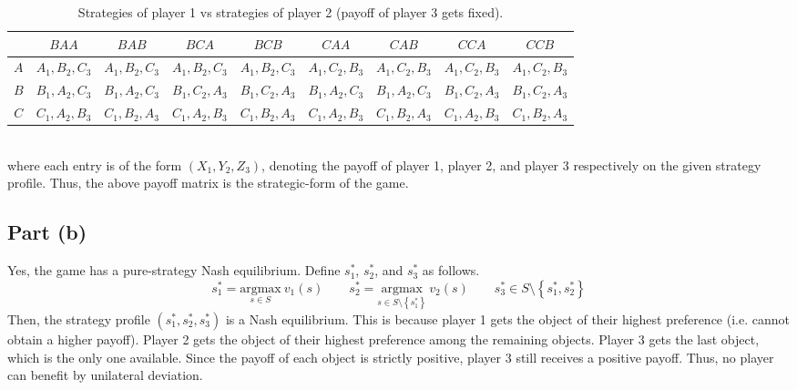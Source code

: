 \documentclass[9pt]{article}
\begin{document}
\begin{table}[htbp]
    \centering
    \begin{tabular}{c|cccccccc}
        & $BAA$ & $BAB$ & $BCA$ & $BCB$ & $CAA$ & $CAB$ & $CCA$ & $CCB$ \\
        \hline
        $A$ & $A_{1}, B_{2}, C_{3}$ & $A_{1}, B_{2}, C_{3}$ & $A_{1}, B_{2}, C_{3}$ & $A_{1}, B_{2}, C_{3}$ & $A_{1}, C_{2}, B_{3}$ & $A_{1}, C_{2}, B_{3}$ & $A_{1}, C_{2}, B_{3}$ & $A_{1}, C_{2}, B_{3}$ \\
        $B$ & $B_{1}, A_{2}, C_{3}$ & $B_{1}, A_{2}, C_{3}$ & $B_{1}, C_{2}, A_{3}$ & $B_{1}, C_{2}, A_{3}$ & $B_{1}, A_{2}, C_{3}$ & $B_{1}, A_{2}, C_{3}$ & $B_{1}, C_{2}, A_{3}$ & $B_{1}, C_{2}, A_{3}$ \\
        $C$ & $C_{1}, A_{2}, B_{3}$ & $C_{1}, B_{2}, A_{3}$ & $C_{1}, A_{2}, B_{3}$ & $C_{1}, B_{2}, A_{3}$ & $C_{1}, A_{2}, B_{3}$ & $C_{1}, B_{2}, A_{3}$ & $C_{1}, A_{2}, B_{3}$ & $C_{1}, B_{2}, A_{3}$\\
    \end{tabular}
    \caption{Strategies of player 1 vs strategies of player 2 (payoff of player 3 gets fixed).}
    \label{tab:tab3x8}
\end{table}
\vspace*{0pt} \\
where each entry is of the form $(X_{1}, Y_{2}, Z_{3})$, denoting the payoff of player 1, player 2, and player 3 respectively on the given strategy profile.
Thus, the above payoff matrix is the strategic-form of the game.

\subsection*{Part (b)}
Yes, the game has a pure-strategy Nash equilibrium.
Define $s_{1}^{*}$, $s_{2}^{*}$, and $s_{3}^{*}$ as follows.
\begin{equation}
    s_{1}^{*} = \underset{s \in S}{\text{argmax}} \ v_{1}(s)
    \qquad
    s_{2}^{*} = \underset{s \in S \setminus \left\{ s_{1}^{*} \right\}}{\text{argmax}} \ v_{2}(s)
    \qquad
    s_{3}^{*} \in S \setminus \left\{ s_{1}^{*}, s_{2}^{*} \right\}
\end{equation}
Then, the strategy profile $\left( s_{1}^{*}, s_{2}^{*}, s_{3}^{*} \right)$ is a Nash equilibrium.
This is because player 1 gets the object of their highest preference (i.e. cannot obtain a higher payoff).
Player 2 gets the object of their highest preference among the remaining objects.
Player 3 gets the last object, which is the only one available.
Since the payoff of each object is strictly positive, player 3 still receives a positive payoff.
Thus, no player can benefit by unilateral deviation.
\end{document}
